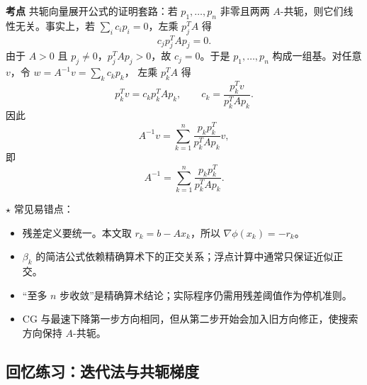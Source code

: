 \documentclass{article}
\newcommand{\keypoint}{\textcolor{red!65!black}{\textbf{$\star$}}}
\newcommand{\exam}{\textcolor{red!65!black}{\textbf{考点}}}
\begin{document}
\exam{} 共轭向量展开公式的证明套路：若
$p_1,\dots,p_n$ 非零且两两 $A$-共轭，则它们线性无关。事实上，若
$\sum_i c_ip_i=0$，左乘 $p_j^TA$ 得
\[
  c_jp_j^TAp_j=0.
\]
由于 $A>0$ 且 $p_j\ne0$，$p_j^TAp_j>0$，故 $c_j=0$。于是
$p_1,\dots,p_n$ 构成一组基。对任意 $v$，令 $w=A^{-1}v=\sum_k c_kp_k$，
左乘 $p_k^TA$ 得
\[
  p_k^Tv=c_kp_k^TAp_k,\qquad
  c_k=\frac{p_k^Tv}{p_k^TAp_k}.
\]
因此
\[
  A^{-1}v
  =\sum_{k=1}^n\frac{p_kp_k^T}{p_k^TAp_k}v,
\]
即
\[
  A^{-1}=\sum_{k=1}^n\frac{p_kp_k^T}{p_k^TAp_k}.
\]

\keypoint{} 常见易错点：
\begin{itemize}
  \item 残差定义要统一。本文取 $r_k=b-Ax_k$，所以
  $\nabla\phi(x_k)=-r_k$。
  \item $\beta_k$ 的简洁公式依赖精确算术下的正交关系；浮点计算中通常只保证近似正交。
  \item “至多 $n$ 步收敛”是精确算术结论；实际程序仍需用残差阈值作为停机准则。
  \item CG 与最速下降第一步方向相同，但从第二步开始会加入旧方向修正，使搜索方向保持 $A$-共轭。
\end{itemize}

\subsection{回忆练习：迭代法与共轭梯度}
\end{document}
